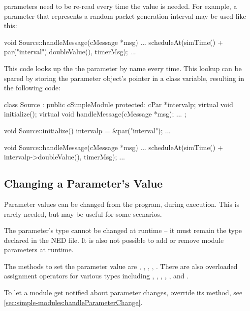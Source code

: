  parameters need to be re-read every time the value is needed.
For example, a parameter that represents a random packet generation interval
may be used like this:

\begin{cpp}
void Source::handleMessage(cMessage *msg)
{
    ...
    scheduleAt(simTime() + par("interval").doubleValue(), timerMsg);
    ...
}
\end{cpp}

This code looks up the the parameter by name every time. This lookup
can be spared by storing the parameter object's pointer in a class variable,
resulting in the following code:

\begin{cpp}
class Source : public cSimpleModule
{
  protected:
    cPar *intervalp;
    virtual void initialize();
    virtual void handleMessage(cMessage *msg);
    ...
};

void Source::initialize()
{
    intervalp = &par("interval");
    ...
}

void Source::handleMessage(cMessage *msg)
{
    ...
    scheduleAt(simTime() + intervalp->doubleValue(), timerMsg);
    ...
}
\end{cpp}


\subsection{Changing a Parameter's Value}
\label{sec:simple-modules:setting-parameters}

Parameter values can be changed from the program, during execution.
This is rarely needed, but may be useful for some scenarios.

\begin{note}
    The parameter's type cannot be changed at runtime -- it must
    remain the type declared in the NED file. It is also not possible
    to add or remove module parameters at runtime.
\end{note}

The methods to set the parameter value are ,
, ,
, . There are also
overloaded assignment operators for various types including ,
, , , , and
.

To let a module get notified about parameter changes, override
its  method, see
\ref{sec:simple-modules:handleParameterChange}.


